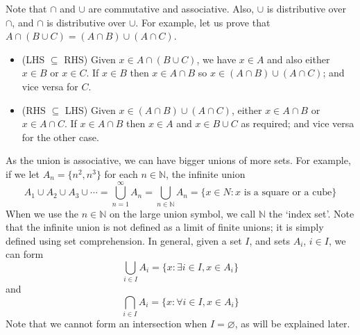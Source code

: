 Note that \(\cap\) and \(\cup\) are commutative and associative. Also, \(\cup\) is distributive over \(\cap\), and \(\cap\) is distributive over \(\cup\). For example, let us prove that \(A \cap (B \cup C) = (A \cap B) \cup (A \cap C)\).
\begin{itemize}
	\item (LHS \(\subseteq\) RHS) Given \(x \in A \cap (B \cup C)\), we have \(x \in A\) and also either \(x \in B\) or \(x \in C\). If \(x \in B\) then \(x \in A \cap B\) so \(x \in (A \cap B) \cup (A \cap C)\); and vice versa for \(C\).
	\item (RHS \(\subseteq\) LHS) Given \(x \in (A \cap B) \cup (A \cap C)\), either \(x \in A \cap B\) or \(x \in A \cap C\). If \(x \in A \cap B\) then \(x \in A\) and \(x \in B \cup C\) as required; and vice versa for the other case.
\end{itemize}
As the union is associative, we can have bigger unions of more sets. For example, if we let \(A_n = \{ n^2, n^3 \}\) for each \(n \in \mathbb N\), the infinite union
\[ A_1 \cup A_2 \cup A_3 \cup \cdots = \bigcup_{n=1}^\infty A_n = \bigcup_{n \in \mathbb N} A_n = \{ x \in N: x \text{ is a square or a cube} \} \]
When we use the \(n \in \mathbb N\) on the large union symbol, we call \(\mathbb N\) the `index set'. Note that the infinite union is not defined as a limit of finite unions; it is simply defined using set comprehension. In general, given a set \(I\), and sets \(A_i\), \(i \in I\), we can form
\[ \bigcup_{i \in I}A_i = \{ x: \exists i \in I, x \in A_i \} \]
and
\[ \bigcap_{i \in I}A_i = \{ x: \forall i \in I, x \in A_i \} \]
Note that we cannot form an intersection when \(I = \varnothing\), as will be explained later.
